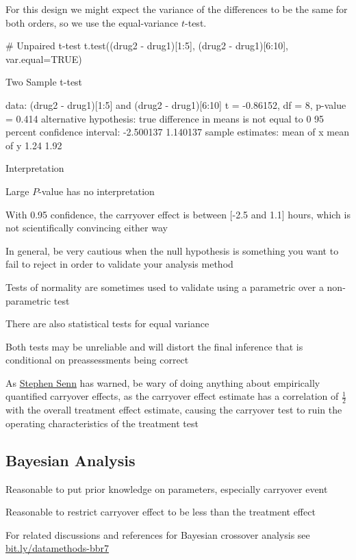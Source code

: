 For this design we might expect the variance of the differences to be
the same for both orders, so we use the equal-variance $t$-test.
\begin{Schunk}
\begin{Sinput}
# Unpaired t-test
t.test((drug2 - drug1)[1:5], (drug2 - drug1)[6:10], var.equal=TRUE)
\end{Sinput}
\begin{Soutput}

	Two Sample t-test

data:  (drug2 - drug1)[1:5] and (drug2 - drug1)[6:10]
t = -0.86152, df = 8, p-value = 0.414
alternative hypothesis: true difference in means is not equal to 0
95 percent confidence interval:
 -2.500137  1.140137
sample estimates:
mean of x mean of y 
     1.24      1.92 
\end{Soutput}
\end{Schunk}
\bi
\item Interpretation
 \bi
 \item Large $P$-value has no interpretation
 \item With 0.95 confidence, the carryover effect is between [-2.5 and 1.1] hours, which is not scientifically convincing either way
 \item In general, be very cautious when the null hypothesis is something you want to fail to reject in order to validate your analysis method
   \bi
     \item Tests of normality are sometimes used to validate using a parametric over a non-parametric test
     \item There are also statistical tests for equal variance
     \item Both tests may be unreliable and will distort the final
       inference that is conditional on preassessments being correct
   \ei
 \ei
 \item As \href{https://www.amazon.com/Cross-over-Trials-Clinical-Research-Stephen/dp/0471496537}{Stephen Senn} has warned, be wary of doing anything
   about empirically quantified carryover effects, as the carryover
   effect estimate has a correlation of $\frac{1}{2}$ with the overall
   treatment effect estimate, causing the carryover test to ruin the
   operating characteristics of the treatment test
\ei

\subsection{Bayesian Analysis}

\bi
\item Reasonable to put prior knowledge on parameters, especially carryover event
\item Reasonable to restrict carryover effect to be less than the treatment effect
\item For related discussions and references for Bayesian crossover analysis see\\ \href{http://bit.ly/datamethods-bbr7}{bit.ly/datamethods-bbr7}
\ei
